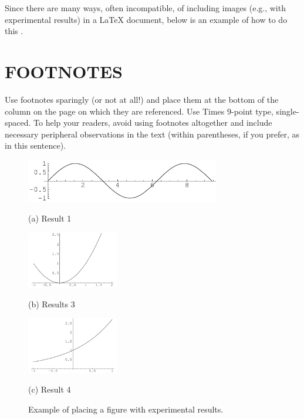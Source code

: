 \documentclass{article}
\begin{document}
Since there are many ways, often incompatible, of including images (e.g., with
experimental results) in a LaTeX document, below is an example of how to do
this \cite{Smith1920}.

\section{FOOTNOTES}
\label{sec:foot}

Use footnotes sparingly (or not at all!) and place them at the bottom of the
column on the page on which they are referenced. Use Times 9-point type,
single-spaced. To help your readers, avoid using footnotes altogether and
include necessary peripheral observations in the text (within parentheses, if
you prefer, as in this sentence).

\begin{figure}[htb]

\begin{minipage}[b]{1.0\linewidth}
  \centering
  \centerline{\includegraphics[width=8.5cm]{image1}}
  \centerline{(a) Result 1}\medskip
\end{minipage}
%
\begin{minipage}[b]{.48\linewidth}
  \centering
  \centerline{\includegraphics[width=4.0cm]{image3}}
  \centerline{(b) Results 3}\medskip
\end{minipage}
\hfill
\begin{minipage}[b]{0.48\linewidth}
  \centering
  \centerline{\includegraphics[width=4.0cm]{image4}}
  \centerline{(c) Result 4}\medskip
\end{minipage}
%
\caption{Example of placing a figure with experimental results.}
\label{fig:res}
%
\end{figure}
\end{document}
